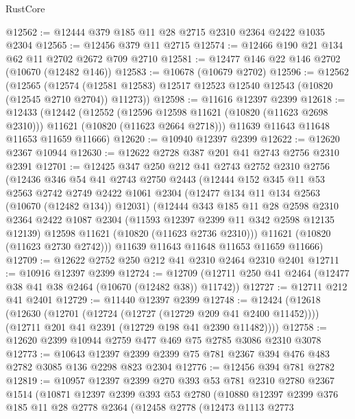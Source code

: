\begin{lexlean}{RustCore}
\begin{coremodule}
@12562 := @12444 @379 @185 @11 @28 @2715 @2310 @2364 @2422 @1035 @2304
@12565 := @12456 @379 @11 @2715
@12574 := @12466 @190 @21 @134 @62 @11 @2702 @2672 @709 @2710
@12581 := @12477 @146 @22 @146 @2702 (@10670 (@12482 @146))
@12583 := @10678 (@10679 @2702)
@12596 := @12562
    (@12565
      (@12574 (@12581 @12583) @12517 @12523 @12540 @12543 (@10820 (@12545 @2710 @2704)) @11273))
@12598 := @11616 @12397 @2399
@12618 := @12433
    (@12442
      (@12552
        (@12596 @12598 @11621 (@10820 (@11623 @2698 @2310)))
        @11621
        (@10820 (@11623 @2664 @2718)))
      @11639
      @11643
      @11648
      @11653
      @11659
      @11666)
@12620 := @10940 @12397 @2399
@12622 := @12620 @2367 @10944
@12630 := @12622 @2728 @387 @201 @41 @2743 @2756 @2310 @2391
@12701 := @12425
    @347
    @250
    @212
    @41
    @2743
    @2752
    @2310
    @2756
    (@12436
      @346
      @54
      @41
      @2743
      @2750
      @2443
      (@12444
        @152
        @345
        @11
        @53
        @2563
        @2742
        @2749
        @2422
        @1061
        @2304
        (@12477 @134 @11 @134 @2563 (@10670 (@12482 @134)) @12031)
        (@12444
          @343
          @185
          @11
          @28
          @2598
          @2310
          @2364
          @2422
          @1087
          @2304
          (@11593 @12397 @2399 @11 @342 @2598 @12135 @12139)
          @12598
          @11621
          (@10820 (@11623 @2736 @2310)))
        @11621
        (@10820 (@11623 @2730 @2742)))
      @11639
      @11643
      @11648
      @11653
      @11659
      @11666)
@12709 := @12622 @2752 @250 @212 @41 @2310 @2464 @2310 @2401
@12711 := @10916 @12397 @2399
@12724 := @12709 (@12711 @250 @41 @2464 (@12477 @38 @41 @38 @2464 (@10670 (@12482 @38)) @11742))
@12727 := @12711 @212 @41 @2401
@12729 := @11440 @12397 @2399
@12748 := @12424
    (@12618
      (@12630
        (@12701 (@12724 (@12727 (@12729 @209 @41 @2400 @11452))))
        (@12711 @201 @41 @2391 (@12729 @198 @41 @2390 @11482))))
@12758 := @12620 @2399 @10944 @2759 @477 @469 @75 @2785 @3086 @2310 @3078
@12773 := @10643 @12397 @2399 @2399 @75 @781 @2367 @394 @476 @483 @2782 @3085 @136 @2298 @823 @2304
@12776 := @12456 @394 @781 @2782
@12819 := @10957
    @12397
    @2399
    @270
    @393
    @53
    @781
    @2310
    @2780
    @2367
    @1514
    (@10871
      @12397
      @2399
      @393
      @53
      @2780
      (@10880
        @12397
        @2399
        @376
        @185
        @11
        @28
        @2778
        @2364
        (@12458
          @2778
          (@12473
            @1113
            @2773

\end{coremodule}
\end{lexlean}
